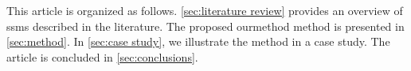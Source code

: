 This article is organized as follows.
\cref{sec:literature review} provides an overview of \acp{ssm} described in the literature.
The proposed \ac{ourmethod} method is presented in \cref{sec:method}.
In \cref{sec:case study}, we illustrate the method in a case study.
The article is concluded in \cref{sec:conclusions}.
